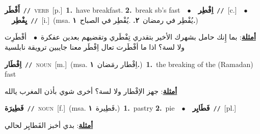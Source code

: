 \documentclass[10pt,a4paper,twoside]{article} %
\begin{document}
\begin{multicols}{2}
{\setlength\topsep{0pt}\textbf{\foreignlanguage{arabic}{أَفْطَر}}\ {\color{gray}\texttt{//}\color{black}}\ \textsc{verb}\ [p.]\ \textbf{1.}~have breakfast.  \textbf{2.}~break sb's fast\ \ $\bullet$\ \ \setlength\topsep{0pt}\textbf{\foreignlanguage{arabic}{اِفْطِر}}\ {\color{gray}\texttt{//}\color{black}}\ [c.]\ \ $\bullet$\ \ \setlength\topsep{0pt}\textbf{\foreignlanguage{arabic}{يِفْطِر}}\ {\color{gray}\texttt{//}\color{black}}\ [i.]\ \color{gray}(msa. \foreignlanguage{arabic}{يُفْطِر في رمضان}~\foreignlanguage{arabic}{\textbf{٢.}}  .\foreignlanguage{arabic}{يُفْطِر في الصباح}~\foreignlanguage{arabic}{\textbf{١.}})\color{black}\  \begin{flushright}\color{gray}\foreignlanguage{arabic}{\textbf{\underline{\foreignlanguage{arabic}{أمثلة}}}: بما إِنك حامل بشهرك الأخير بتقدري تِفْطَري وتقضيهم بعدين عفكرة\ $\bullet$\ \  أفْطَرِت ولا لسة؟ اذا ما أفْطَرت تعال اِفْطَر معنا جايبين ترويقة نابلسية}\end{flushright}\color{black}} \vspace{2mm}

{\setlength\topsep{0pt}\textbf{\foreignlanguage{arabic}{اِفْطَار}}\ {\color{gray}\texttt{//}\color{black}}\ \textsc{noun}\ [m.]\ \color{gray}(msa. \foreignlanguage{arabic}{اِفْطار رمَضان}~\foreignlanguage{arabic}{\textbf{١.}})\color{black}\ \textbf{1.}~the breaking of the (Ramadan) fast\  \begin{flushright}\color{gray}\foreignlanguage{arabic}{\textbf{\underline{\foreignlanguage{arabic}{أمثلة}}}: جهز الاِفْطار ولا لسة؟ أخرى شوي بأذن المغرب يالله}\end{flushright}\color{black}} \vspace{2mm}

{\setlength\topsep{0pt}\textbf{\foreignlanguage{arabic}{فَطِيرَة}}\ {\color{gray}\texttt{//}\color{black}}\ \textsc{noun}\ [f.]\ \color{gray}(msa. \foreignlanguage{arabic}{فَطِيرة}~\foreignlanguage{arabic}{\textbf{١.}})\color{black}\ \textbf{1.}~pastry  \textbf{2.}~pie\ \ $\bullet$\ \ \setlength\topsep{0pt}\textbf{\foreignlanguage{arabic}{فَطَايِر}}\ {\color{gray}\texttt{//}\color{black}}\ [pl.]\  \begin{flushright}\color{gray}\foreignlanguage{arabic}{\textbf{\underline{\foreignlanguage{arabic}{أمثلة}}}: بدي أخبز الفَطايِر لحالي}\end{flushright}\color{black}} \vspace{2mm}


\end{multicols}
\end{document}
